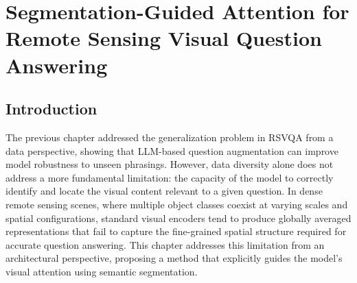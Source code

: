 %

\chapter{Segmentation-Guided Attention for Remote Sensing Visual Question Answering}
\label{chap:seg_attention}
\startcontents[chapters]

\section{Introduction}
\label{sec:chap4_intro}

The previous chapter addressed the generalization problem
in RSVQA from a data perspective, showing that LLM-based
question augmentation can improve model robustness to
unseen phrasings. However, data diversity alone does not
address a more fundamental limitation: the capacity of the
model to correctly identify and locate the visual content
relevant to a given question. In dense remote sensing scenes,
where multiple object classes coexist at varying scales and
spatial configurations, standard visual encoders tend to
produce globally averaged representations that fail to capture
the fine-grained spatial structure required for accurate
question answering. This chapter addresses this limitation
from an architectural perspective, proposing a method that
explicitly guides the model's visual attention using semantic
segmentation.


